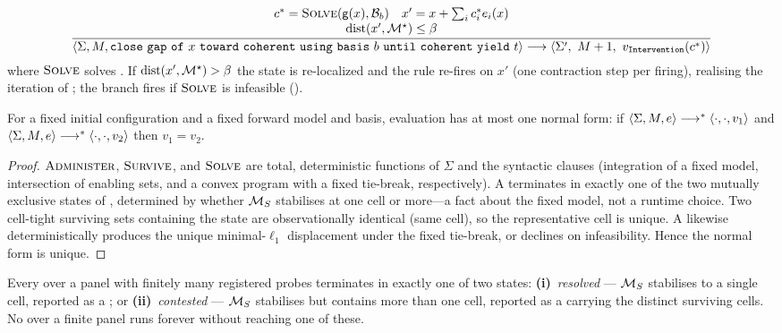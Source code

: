 \begin{rulename}
\label{cfc:rule:close-step}
\[
\frac{\begin{array}{c}
\dose^{\ast}=\textsc{Solve}(\gap(x),\basis_b)\quad x'=x+\textstyle\sum_i \dose^{\ast}_i e_i(x)\\
\dist(x',\Coh)\le\flo
\end{array}}
{\langle\Sigma,\rec,\cfckw{close}\ \cfckw{gap}\ \cfckw{of}\ x\ \cfckw{toward}\ \cfckw{coherent}\ \cfckw{using}\ \cfckw{basis}\ b\ \cfckw{until}\ \cfckw{coherent}\ \cfckw{yield}\ t\rangle\stepto
 \langle\Sigma',\ \rec+1,\ v_{\cfckw{Intervention}}(\dose^{\ast})\rangle}
\]
where $\textsc{Solve}$ solves . If $\operatorname{dist}(x',\mathcal{M}^{\star})>\beta$ the
state is re-localized and the rule re-fires on $x'$ (one contraction step per
firing), realising the iteration of ; the
 branch fires if $\textsc{Solve}$ is infeasible
().
\end{rulename}

\begin{theorem}[Determinism]
\label{cfc:thm:determinism}
For a fixed initial configuration and a fixed forward model and basis, 
evaluation has at most one normal form: if
$\langle\Sigma,M,e\rangle\longrightarrow^{\ast}\langle\cdot,\cdot,v_1\rangle$ and
$\langle\Sigma,M,e\rangle\longrightarrow^{\ast}\langle\cdot,\cdot,v_2\rangle$ then
$v_1=v_2$.
\end{theorem}

\begin{proof}
$\textsc{Administer}$, $\textsc{Survive}$, and $\textsc{Solve}$ are total,
deterministic functions of $\Sigma$ and the syntactic clauses (integration of a
fixed model, intersection of enabling sets, and a convex program with a fixed
tie-break, respectively). A  terminates in exactly one of the two
mutually exclusive states of , determined by whether
$\mathcal{M}_S$ stabilises at one cell or more---a fact about the fixed model, not a
runtime choice. Two cell-tight surviving sets containing the state are
observationally identical (same cell), so the representative cell is unique. A
 likewise deterministically produces the unique minimal-$\ell_1$
displacement under the fixed tie-break, or declines on infeasibility. Hence the
normal form is unique.
\end{proof}

\begin{theorem}
\label{cfc:thm:decline}
Every  over a panel with finitely many registered probes
terminates in exactly one of two states: \textbf{(i)}~\emph{resolved} ---
$\mathcal{M}_S$ stabilises to a single cell, reported as a ; or
\textbf{(ii)}~\emph{contested} --- $\mathcal{M}_S$ stabilises but contains more than
one cell, reported as a  carrying the distinct surviving cells. No
 over a finite panel runs forever without reaching one of these.
\end{theorem}

